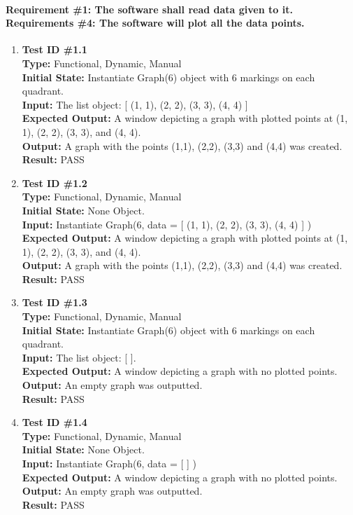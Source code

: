 \documentclass[12pt, titlepage]{article}
\begin{document}
	\paragraph{Requirement \#1: The software shall read data given to it. \\ Requirements \#4: The software will plot all the data points.}
		\begin{enumerate}
			\item{\textbf{Test ID \#1.1\\}}
			\textbf{Type:} Functional, Dynamic, Manual\\
			\textbf{Initial State:} Instantiate Graph(6) object with 6 markings on each quadrant.\\
			\textbf{Input:} The list object: [ (1, 1),  (2, 2), (3, 3), (4, 4) ]\\
			\textbf{Expected Output:} A window depicting a graph with plotted points at (1, 1), (2, 2), (3, 3), and (4, 4). \\
			\textbf{Output:}	A graph with the points (1,1), (2,2), (3,3) and (4,4) was created.\\	
			\textbf{Result:} PASS

					
			\item{\textbf{Test ID \#1.2\\}}
			\textbf{Type:} Functional, Dynamic, Manual\\
			\textbf{Initial State:} None Object.\\
			\textbf{Input:} Instantiate Graph(6, data = [ (1, 1),  (2, 2), (3, 3), (4, 4) ] )\\
			\textbf{Expected Output:} A window depicting a graph with plotted points at (1, 1), (2, 2), (3, 3), and (4, 4). \\
			\textbf{Output:}	A graph with the points (1,1), (2,2), (3,3) and (4,4) was created.\\	
			\textbf{Result:} PASS
				
			\item{\textbf{Test ID \#1.3\\}}
			\textbf{Type:} Functional, Dynamic, Manual\\
			\textbf{Initial State:} Instantiate Graph(6) object with 6 markings on each quadrant.\\
			\textbf{Input:} The list object: [	].\\
			\textbf{Expected Output:} A window depicting a graph with no plotted points.\\
			\textbf{Output:}	An empty graph was outputted.\\
			\textbf{Result:} PASS

			\item{\textbf{Test ID \#1.4\\}}
			\textbf{Type:} Functional, Dynamic, Manual\\
			\textbf{Initial State:} None Object.\\
			\textbf{Input:} Instantiate Graph(6, data = [  ] )\\
			\textbf{Expected Output:} A window depicting a graph with no plotted points.\\
			\textbf{Output:}	An empty graph was outputted.\\
			\textbf{Result:} PASS
	\end{enumerate}
\end{document}
